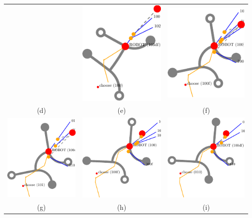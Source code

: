 \documentclass[10pt,a4paper]{article}
\begin{document}
\begin{tabular}{ccc}
&
\includegraphics[width=.3\textwidth]{pics/pathplanner_without_noise/example_curve/dec_9.pdf}
&
\includegraphics[width=.3\textwidth]{pics/pathplanner_without_noise/example_curve/dec_10.pdf}
\\
(d) & (e) & (f) 
\\
\includegraphics[width=.3\textwidth]{pics/pathplanner_without_noise/example_curve/dec_12.pdf}
&
\includegraphics[width=.3\textwidth]{pics/pathplanner_without_noise/example_curve/dec_16.pdf}
&
\includegraphics[width=.3\textwidth]{pics/pathplanner_without_noise/example_curve/dec_18.pdf}
\\
(g) & (h) & (i)\\
\end{tabular}
\end{document}

